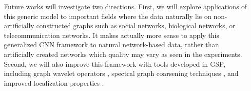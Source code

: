 \documentclass{article}
\begin{document}
Future works will investigate two directions. First, we will explore
applications of this generic model to important fields where the data naturally
lie on non-artificially constructed graphs such as social networks, biological
networks, or telecommunication networks. It makes actually more sense to apply
this generalized CNN framework to natural network-based data, rather than
artificially created networks which quality may vary as seen in the experiments.
Second, we will also improve this framework with tools developed in GSP,
including graph wavelet operators
\cite{art:HammondVandergheynstGribonval11GraphWav, art:CoifmanLafon06DifMap,
	pro:GavishNadlerCoifman10GraphHaar, pro:ChenChengMallat14deepHaar,
	pro:RustamovGuibas14deepHaar}, spectral graph coarsening techniques
	\cite{art:ShumanFarajiVandergheynst16PyramTrans}, and improved localization
	properties \cite{pro:TsitsveroBarbarossa15Uncert,
	pro:PasdeloupAlamiGriponRabbat15Uncert,
art:PerraudinRicaudShumanVandergheynst16Uncert}.


\newpage

{ \small

%
}
\end{document}
